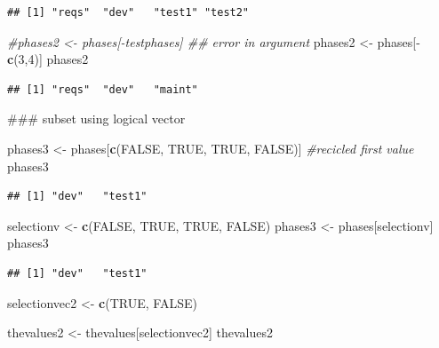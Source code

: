 \documentclass[]{book}
\newenvironment{Shaded}{\begin{snugshade}}{\end{snugshade}}
\newcommand{\KeywordTok}[1]{\textcolor[rgb]{0.13,0.29,0.53}{\textbf{{#1}}}}
\newcommand{\DecValTok}[1]{\textcolor[rgb]{0.00,0.00,0.81}{{#1}}}
\newcommand{\StringTok}[1]{\textcolor[rgb]{0.31,0.60,0.02}{{#1}}}
\newcommand{\CommentTok}[1]{\textcolor[rgb]{0.56,0.35,0.01}{\textit{{#1}}}}
\newcommand{\OtherTok}[1]{\textcolor[rgb]{0.56,0.35,0.01}{{#1}}}
\newcommand{\NormalTok}[1]{{#1}}
\begin{document}
\begin{verbatim}
## [1] "reqs"  "dev"   "test1" "test2"
\end{verbatim}

\begin{Shaded}
\begin{Highlighting}[]
\CommentTok{#phases2 <- phases[-testphases] ## error in argument}
\NormalTok{phases2 <-}\StringTok{ }\NormalTok{phases[-}\KeywordTok{c}\NormalTok{(}\DecValTok{3}\NormalTok{,}\DecValTok{4}\NormalTok{)]}
\NormalTok{phases2}
\end{Highlighting}
\end{Shaded}

\begin{verbatim}
## [1] "reqs"  "dev"   "maint"
\end{verbatim}

\begin{Shaded}
\begin{Highlighting}[]
\NormalTok{### subset using logical vector}

\NormalTok{phases3 <-}\StringTok{ }\NormalTok{phases[}\KeywordTok{c}\NormalTok{(}\OtherTok{FALSE}\NormalTok{, }\OtherTok{TRUE}\NormalTok{, }\OtherTok{TRUE}\NormalTok{, }\OtherTok{FALSE}\NormalTok{)] }\CommentTok{#recicled first value}
\NormalTok{phases3}
\end{Highlighting}
\end{Shaded}

\begin{verbatim}
## [1] "dev"   "test1"
\end{verbatim}

\begin{Shaded}
\begin{Highlighting}[]
\NormalTok{selectionv <-}\StringTok{ }\KeywordTok{c}\NormalTok{(}\OtherTok{FALSE}\NormalTok{, }\OtherTok{TRUE}\NormalTok{, }\OtherTok{TRUE}\NormalTok{, }\OtherTok{FALSE}\NormalTok{)}
\NormalTok{phases3 <-}\StringTok{ }\NormalTok{phases[selectionv]}
\NormalTok{phases3}
\end{Highlighting}
\end{Shaded}

\begin{verbatim}
## [1] "dev"   "test1"
\end{verbatim}

\begin{Shaded}
\begin{Highlighting}[]
\NormalTok{selectionvec2 <-}\StringTok{ }\KeywordTok{c}\NormalTok{(}\OtherTok{TRUE}\NormalTok{, }\OtherTok{FALSE}\NormalTok{)}

\NormalTok{thevalues2 <-}\StringTok{ }\NormalTok{thevalues[selectionvec2]}
\NormalTok{thevalues2}
\end{Highlighting}
\end{Shaded}
\end{document}
